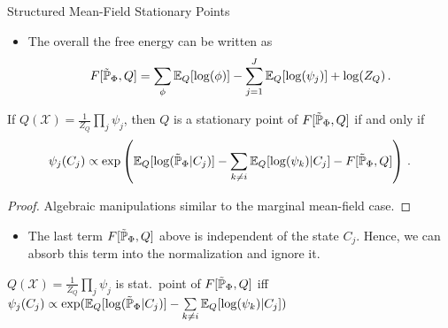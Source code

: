 \begin{frame}{Structured Mean-Field Stationary Points}
    \begin{itemize}
        \item The overall the free energy can be written as
        \begin{equation}
            F[\tilde{\Pb}_{\Phi},Q] = \sum_{\phi} \E_Q[\log(\phi)] - \sum_{j=1}^J \E_Q[\log(\psi_j)] + \log(Z_Q)\,.
        \end{equation}
    \end{itemize}
    \pause
    \begin{theorem}
       If $Q(\mathcal{X}) = \frac{1}{Z_Q} \prod_j \psi_j$, then $Q$ is a stationary point of $F[\tilde{\Pb}_{\Phi},Q]$ if and only if 
       \begin{equation}
        \psi_j(C_j) \propto \exp \left(
            \E_Q[\log(\tilde{\Pb}_{\Phi} | C_j)] - \sum_{k \neq i} \E_Q[\log(\psi_k) | C_j] - F[\tilde{\Pb}_{\Phi}, Q]
            \right)\,.
       \end{equation}
    \end{theorem}
    \pause
    \begin{proof}
    Algebraic manipulations similar to the marginal mean-field case.
    \end{proof}
    \begin{itemize}
        \pause \item  The last term $F[\tilde{\Pb}_{\Phi},Q]$ above is independent of the state $C_j$.
        Hence, we can absorb this term into the normalization and ignore it.
    \end{itemize}
    \pause
    \begin{corollary}
       $Q(\mathcal{X}) = \frac{1}{Z_Q} \prod\limits_j \psi_j$ is stat.\ point of $F[\tilde{\Pb}_{\Phi},Q]$ iff 
        $\psi_j(C_j) \propto \exp (
            \E_Q[\log(\tilde{\Pb}_{\Phi} | C_j)] - \sum\limits_{k \neq i} \E_Q[\log(\psi_k) | C_j] 
            )$
    \end{corollary}
\end{frame}

